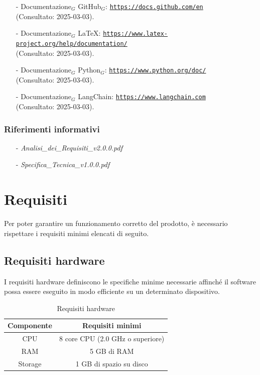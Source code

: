 \documentclass[10pt]{article}
\begin{document}
\begin{justify}
\begin{itemize}
    \item[-] Documentazione$_G$ GitHub$_G$: \textcolor{blue}{\texttt{\url{https://docs.github.com/en}}} \\
    (Consultato: 2025-03-03).
    
    \item[-] Documentazione$_G$ \LaTeX: \textcolor{blue}{\texttt{\url{https://www.latex-project.org/help/documentation/}}} \\
    (Consultato: 2025-03-03).
    
    \item[-] Documentazione$_G$ Python$_G$: \textcolor{blue}{\texttt{\url{https://www.python.org/doc/}}} \\
    (Consultato: 2025-03-03).
    
    \item[-] Documentazione$_G$ LangChain: \textcolor{blue}{\texttt{\url{https://www.langchain.com}}} \\
    (Consultato: 2025-03-03).
\end{itemize}

\subsubsection{Riferimenti informativi}
\begin{itemize}
    \item[-] \textit{Analisi\_dei\_Requisiti\_v2.0.0.pdf}
    \item[-] \textit{Specifica\_Tecnica\_v1.0.0.pdf}
\end{itemize}


\newpage


\section{Requisiti}
\label{sec:requisiti}
Per poter garantire un funzionamento corretto del prodotto, è necessario rispettare i requisiti minimi elencati di seguito.

\subsection{Requisiti hardware}
I requisiti hardware definiscono le specifiche minime necessarie affinché il software possa essere eseguito in modo efficiente su un determinato dispositivo.

\begin{table}[H]
    \centering
    \begin{tabular}{|c|c|}
        \hline
        \rowcolor{gray!25}
        Componente & Requisiti minimi \\
        \hline
        CPU & 8 core CPU (2.0 GHz o superiore)\\
        \hline
        RAM & 5 GB di RAM\\
        \hline
        Storage & 1 GB di spazio su disco\\
        \hline
    \end{tabular}
    \caption{Requisiti hardware}
    \label{tab:requisiti_hardware}
\end{table}


\end{justify}
\end{document}
